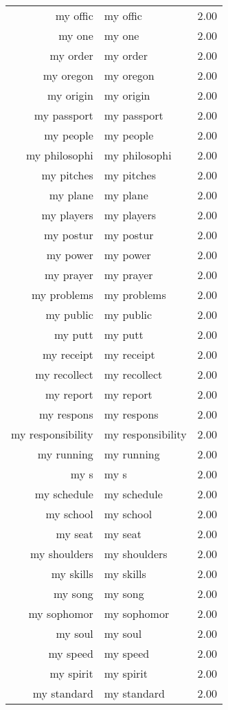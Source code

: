 \begin{table}[ht]
\begin{tabular}{rlr}
  my offic & my offic & 2.00 \\ 
  my one & my one & 2.00 \\ 
  my order & my order & 2.00 \\ 
  my oregon & my oregon & 2.00 \\ 
  my origin & my origin & 2.00 \\ 
  my passport & my passport & 2.00 \\ 
  my people & my people & 2.00 \\ 
  my philosophi & my philosophi & 2.00 \\ 
  my pitches & my pitches & 2.00 \\ 
  my plane & my plane & 2.00 \\ 
  my players & my players & 2.00 \\ 
  my postur & my postur & 2.00 \\ 
  my power & my power & 2.00 \\ 
  my prayer & my prayer & 2.00 \\ 
  my problems & my problems & 2.00 \\ 
  my public & my public & 2.00 \\ 
  my putt & my putt & 2.00 \\ 
  my receipt & my receipt & 2.00 \\ 
  my recollect & my recollect & 2.00 \\ 
  my report & my report & 2.00 \\ 
  my respons & my respons & 2.00 \\ 
  my responsibility & my responsibility & 2.00 \\ 
  my running & my running & 2.00 \\ 
  my s & my s & 2.00 \\ 
  my schedule & my schedule & 2.00 \\ 
  my school & my school & 2.00 \\ 
  my seat & my seat & 2.00 \\ 
  my shoulders & my shoulders & 2.00 \\ 
  my skills & my skills & 2.00 \\ 
  my song & my song & 2.00 \\ 
  my sophomor & my sophomor & 2.00 \\ 
  my soul & my soul & 2.00 \\ 
  my speed & my speed & 2.00 \\ 
  my spirit & my spirit & 2.00 \\ 
  my standard & my standard & 2.00 \\ 

\end{tabular}
\end{table}

